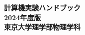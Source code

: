 \documentclass[uplatex,dvipdfmx]{jsbook}
\newcommand{\nendo}{2024}
\newcommand{\hann}{\nendo 年度版}
\begin{document}
\thispagestyle{empty}
\pagestyle{empty}
\begin{titlepage}
    \vspace*{5cm}
    \begin{center}
        \textbf{\Huge 計算機実験ハンドブック}\\
        \vspace*{14cm}
        \textbf{\LARGE \hann}\\
        \vspace{1.0cm}
        \textbf{\LARGE 東京大学理学部物理学科}
    \end{center}
\end{titlepage}
\clearpage
\pagestyle{empty}
\cleardoublepage


\clearpage

\cleardoublepage

\setcounter{page}{1}
\setcounter{tocdepth}{3}
\tableofcontents

\clearpage
\pagestyle{plain}
\cleardoublepage






\end{document}
